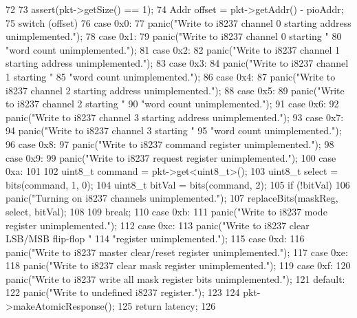 \begin{DoxyCode}
72 {
73     assert(pkt->getSize() == 1);
74     Addr offset = pkt->getAddr() - pioAddr;
75     switch (offset) {
76       case 0x0:
77         panic("Write to i8237 channel 0 starting address unimplemented.\n");
78       case 0x1:
79         panic("Write to i8237 channel 0 starting "
80                 "word count unimplemented.\n");
81       case 0x2:
82         panic("Write to i8237 channel 1 starting address unimplemented.\n");
83       case 0x3:
84         panic("Write to i8237 channel 1 starting "
85                 "word count unimplemented.\n");
86       case 0x4:
87         panic("Write to i8237 channel 2 starting address unimplemented.\n");
88       case 0x5:
89         panic("Write to i8237 channel 2 starting "
90                 "word count unimplemented.\n");
91       case 0x6:
92         panic("Write to i8237 channel 3 starting address unimplemented.\n");
93       case 0x7:
94         panic("Write to i8237 channel 3 starting "
95                 "word count unimplemented.\n");
96       case 0x8:
97         panic("Write to i8237 command register unimplemented.\n");
98       case 0x9:
99         panic("Write to i8237 request register unimplemented.\n");
100       case 0xa:
101         {
102             uint8_t command = pkt->get<uint8_t>();
103             uint8_t select = bits(command, 1, 0);
104             uint8_t bitVal = bits(command, 2);
105             if (!bitVal)
106                 panic("Turning on i8237 channels unimplemented.\n");
107             replaceBits(maskReg, select, bitVal);
108         }
109         break;
110       case 0xb:
111         panic("Write to i8237 mode register unimplemented.\n");
112       case 0xc:
113         panic("Write to i8237 clear LSB/MSB flip-flop "
114                 "register unimplemented.\n");
115       case 0xd:
116         panic("Write to i8237 master clear/reset register unimplemented.\n");
117       case 0xe:
118         panic("Write to i8237 clear mask register unimplemented.\n");
119       case 0xf:
120         panic("Write to i8237 write all mask register bits unimplemented.\n");
121       default:
122         panic("Write to undefined i8237 register.\n");
123     }
124     pkt->makeAtomicResponse();
125     return latency;
126 }
\end{DoxyCode}


